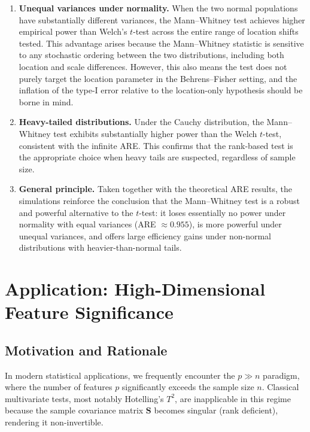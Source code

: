\documentclass[10pt]{article}
\begin{document}
\begin{enumerate}
  \item \textbf{Unequal variances under normality.} When the two normal
        populations have substantially different variances, the Mann--Whitney
        test achieves higher empirical power than Welch's $t$-test across the
        entire range of location shifts tested. This advantage arises because
        the Mann--Whitney statistic is sensitive to any stochastic ordering
        between the two distributions, including both location and scale
        differences. However, this also means the test does not purely target
        the location parameter in the Behrens--Fisher setting, and the inflation
        of the type-I error relative to the location-only hypothesis should be
        borne in mind.

  \item \textbf{Heavy-tailed distributions.} Under the Cauchy distribution,
        the Mann--Whitney test exhibits substantially higher power than the
        Welch $t$-test, consistent with the infinite ARE. This confirms that
        the rank-based test is the appropriate choice when heavy tails are
        suspected, regardless of sample size.

  \item \textbf{General principle.} Taken together with the theoretical ARE
        results, the simulations reinforce the conclusion that the Mann--Whitney
        test is a robust and powerful alternative to the $t$-test: it loses
        essentially no power under normality with equal variances (ARE $\approx
        0.955$), is more powerful under unequal variances, and offers large
        efficiency gains under non-normal distributions with heavier-than-normal
        tails.
\end{enumerate}

\section{Application: High-Dimensional Feature Significance}

\subsection{Motivation and Rationale}
In modern statistical applications, we frequently encounter the $p \gg n$ paradigm, where the number of features $p$ significantly exceeds the sample size $n$. Classical multivariate tests, most notably Hotelling's $T^2$, are inapplicable in this regime because the sample covariance matrix $\mathbf{S}$ becomes singular (rank deficient), rendering it non-invertible. 
\end{document}
